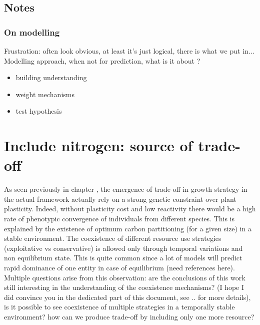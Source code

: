 


\section{Notes}

\subsection{On modelling}
Frustration: often look obvious, at least it's just logical, there is what we put in...\\

Modelling approach, when not for prediction, what is it about ?
\begin{itemize}
\item building understanding
\item weight mechanisms
\item test hypothesis
\end{itemize}


\chapter{Include nitrogen: source of trade-off}

As seen previously in chapter %
, the emergence of trade-off in growth strategy in the actual framework actually rely on a strong genetic constraint over plant plasticity. Indeed, without plasticity cost and low reactivity there would be a high rate of phenotypic convergence of individuals from different species. This is explained by the existence of optimum carbon partitioning (for a given size) in a stable environment. The coexistence of different resource use strategies (exploitative vs conservative) is allowed only through temporal variations and non equilibrium state. This is quite common since a lot of models will predict rapid dominance of one entity in case of equilibrium (need references here).\\
Multiple questions arise from this observation: are the conclusions of this work still interesting in the understanding of the coexistence mechanisms? (I hope I did convince you in the dedicated part of this document, see .. for more details), is it possible to see coexistence of multiple strategies in a temporally stable environment? how can we produce trade-off by including only one more resource?\\

